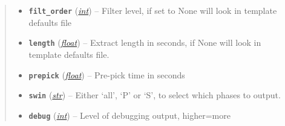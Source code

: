 \documentclass[a4paper,10pt,english]{sphinxmanual}
\begin{document}
\begin{fulllineitems}
\begin{quote}
\begin{description}
\begin{itemize}
\item {} 
\textbf{\texttt{filt\_order}} (\href{https://docs.python.org/library/functions.html\#int}{\emph{int}}) -- Filter level, if set to None will look in            template defaults file

\item {} 
\textbf{\texttt{length}} (\href{https://docs.python.org/library/functions.html\#float}{\emph{float}}) -- Extract length in seconds, if None will look in template            defaults file.

\item {} 
\textbf{\texttt{prepick}} (\href{https://docs.python.org/library/functions.html\#float}{\emph{float}}) -- Pre-pick time in seconds

\item {} 
\textbf{\texttt{swin}} (\href{https://docs.python.org/library/functions.html\#str}{\emph{str}}) -- Either `all', `P' or `S', to select which phases to output.

\item {} 
\textbf{\texttt{debug}} (\href{https://docs.python.org/library/functions.html\#int}{\emph{int}}) -- Level of debugging output, higher=more

\end{itemize}

\end{description}\end{quote}

\end{fulllineitems}

\end{document}

